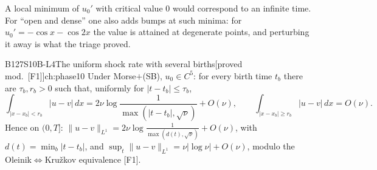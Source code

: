 \documentclass[11pt,a4paper,oneside]{report}
\newcommand{\badge}[2]{\textcolor{#1}{\textsf{\footnotesize[#2]}}}
\newcommand{\modulo}[1]{\badge{cD}{proved mod.\ #1}}
\newenvironment{dimcard}[5]{\par\Needspace{12\baselineskip}\begin{dimcardbox}{#1}{#2}{#3}{#4}{#5}}{\end{dimcardbox}}
\begin{document}
\begin{caution}[title=The case of minima of value zero (triage fix P3-c)]
A local minimum of $u_0'$ with critical value $0$ would correspond to an infinite time. For ``open and dense'' one also adds bumps at such minima: for $u_0'=-\cos x-\cos2x$ the value is attained at degenerate points, and perturbing it away is what the triage proved.
\end{caution}

\begin{dimcard}{B127}{S10B-L4}{The uniform shock rate with several births}{\modulo{[F1]}}{ch:phase10}
Under Morse$+$(SB), $u_0\in C^5$: for every birth time $t_b$ there are $\tau_b,r_b>0$ such that, uniformly for $|t-t_b|\le\tau_b$,
\[
\int_{|x-x_b|<r_b}|u-v|\,dx=2\nu\log\frac1{\max(|t-t_b|,\sqrt\nu)}+O(\nu),\qquad \int_{|x-x_b|\ge r_b}|u-v|\,dx=O(\nu).
\]
Hence on $(0,T]$: $\|u-v\|_{L^1}=2\nu\log\frac1{\max(d(t),\sqrt\nu)}+O(\nu)$, with $d(t)=\min_b|t-t_b|$, and $\sup_t\|u-v\|_{L^1}=\nu|\log\nu|+O(\nu)$, modulo the Oleinik$\iff$Kru\v zkov equivalence [F1].
\end{dimcard}
\end{document}
